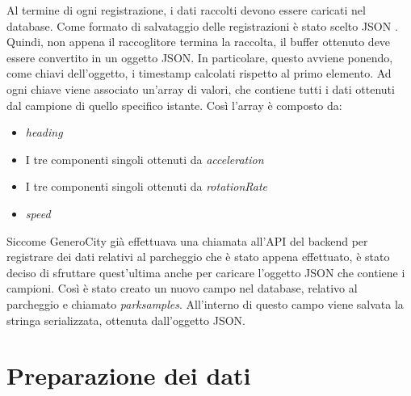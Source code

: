 Al termine di ogni registrazione, i dati raccolti devono essere caricati nel database.
Come formato di salvataggio delle registrazioni è stato scelto JSON 
\cite{javascript_object_notation} \cite{json_data_exchanging}. 
Quindi, non appena
il raccoglitore termina la raccolta, il buffer ottenuto deve essere convertito in un 
oggetto JSON. In particolare, questo avviene ponendo, come chiavi dell'oggetto, i timestamp
calcolati rispetto al primo elemento. Ad ogni chiave viene associato un'array di valori, che
contiene tutti i dati ottenuti dal campione di quello specifico istante. Così l'array è
composto da:
\begin{itemize}
    \item \emph{heading}
    \item I tre componenti singoli ottenuti da \emph{acceleration}
    \item I tre componenti singoli ottenuti da \emph{rotationRate}
    \item \emph{speed}
\end{itemize}
Siccome GeneroCity già effettuava una chiamata all'API del backend per registrare dei dati
relativi al parcheggio che è stato appena effettuato, è stato deciso di sfruttare quest'ultima
anche per caricare l'oggetto JSON che contiene i campioni. Così è stato creato un nuovo campo
nel database, relativo al parcheggio e chiamato \emph{parksamples}. All'interno di questo campo
viene salvata la stringa serializzata, ottenuta dall'oggetto JSON.

\section{Preparazione dei dati} 

